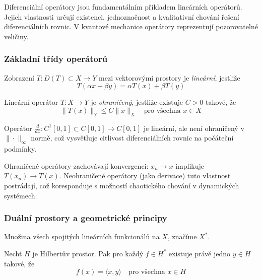 \begin{motivation}
Diferenciální operátory jsou fundamentálním příkladem lineárních operátorů. Jejich vlastnosti určují existenci, jednoznačnost a kvalitativní chování řešení diferenciálních rovnic. V kvantové mechanice operátory reprezentují pozorovatelné veličiny.
\end{motivation}

\subsubsection{Základní třídy operátorů}

\begin{definition}
Zobrazení $T: D(T) \subset X \to Y$ mezi vektorovými prostory je \emph{lineární}, jestliže
\[
T(\alpha x + \beta y) = \alpha T(x) + \beta T(y)
\]
\end{definition}

\begin{definition}
Lineární operátor $T: X \to Y$ je \emph{ohraničený}, jestliže existuje $C > 0$ takové, že
\[
\|T(x)\|_Y \leq C \|x\|_X \quad \text{pro všechna } x \in X
\]
\end{definition}

\begin{example}
Operátor $\frac{d}{dx}: C^1[0,1] \subset C[0,1] \to C[0,1]$ je lineární, ale není ohraničený v $\|\cdot\|_\infty$ normě, což vysvětluje citlivost diferenciálních rovnic na počáteční podmínky.
\end{example}

\begin{intuition}
Ohraničené operátory zachovávají konvergenci: $x_n \to x$ implikuje $T(x_n) \to T(x)$. Neohraničené operátory (jako derivace) tuto vlastnost postrádají, což koresponduje s možností chaotického chování v dynamických systémech.
\end{intuition}

\subsubsection{Duální prostory a geometrické principy}

\begin{definition}
Množina všech spojitých lineárních funkcionálů na $X$, značíme $X^*$.
\end{definition}

\begin{theorem}
Nechť $H$ je Hilbertův prostor. Pak pro každý $f \in H^*$ existuje právě jedno $y \in H$ takové, že
\[
f(x) = \langle x, y \rangle \quad \text{pro všechna } x \in H
\]
\end{theorem}

